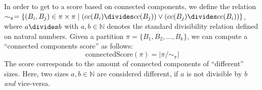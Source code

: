 			In order to get to a score based on connected components, we define the relation $\sim_\pi = \{ (B_i, B_j) \in \pi \times \pi \mid (cc(B_i) \divides cc(B_j)) \lor (cc(B_j) \divides cc(B_i)) \}$, where $a \divides b$ with $a, b \in \mathbb{N}$ denotes the standard divisibility relation defined on natural numbers. 
			Given a partition $\pi = \{ B_1, B_2, \ldots, B_k \}$, we can compute a \enquote{connected components score} as follows:
			\begin{equation*}
				\mathrm{connectedScore}(\pi) = |\pi/\sim_\pi|				
			\end{equation*}
			The score corresponds to the amount of connected components of \enquote{different} sizes.
			Here, two sizes $a, b \in \mathbb{N}$ are considered different, if $a$ is not divisible by $b$ \textit{and} vice-versa.
			
			\clearpage
